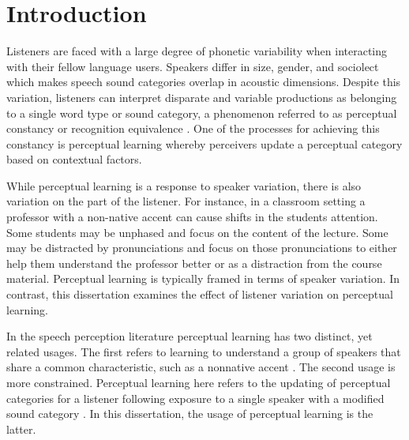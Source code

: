 
\chapter{Introduction}
\label{chap:intro}

Listeners are faced with a large degree of phonetic variability when interacting with their fellow language users.  
Speakers differ in size, gender, and sociolect which makes speech sound categories overlap in acoustic dimensions.
Despite this variation, listeners can interpret disparate and variable productions as belonging to a single word type or sound category, a phenomenon referred to as perceptual constancy \citep{Shankweiler1977, Kuhl1979} or recognition equivalence \citep{Sumner2013}.
One of the processes for achieving this constancy is perceptual learning whereby perceivers update a perceptual category based on contextual factors.

While perceptual learning is a response to speaker variation, there is also variation on the part of the listener.
For instance, in a classroom setting a professor with a non-native accent can cause shifts in the students attention.
Some students may be unphased and focus on the content of the lecture.
Some may be distracted by pronunciations and focus on those pronunciations to either help them understand the professor better or as a distraction from the course material.
Perceptual learning is typically framed in terms of speaker variation.
In contrast, this dissertation examines the effect of listener variation on perceptual learning.

In the speech perception literature perceptual learning has two distinct, yet related usages.
The first refers to learning to understand a group of speakers that share a common characteristic, such as a nonnative accent \citep{Bradlow2008}.
The second usage is more constrained.
Perceptual learning here refers to the updating of perceptual categories for a listener following exposure to a single speaker with a modified sound category \citep{Norris2003}.
In this dissertation, the usage of perceptual learning is the latter.

